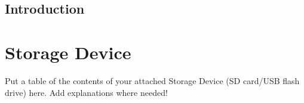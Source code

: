 \documentclass[german=false,thesistype=bachelor,nolistoftables,noabstract]{tubsthesis}
\begin{document}

\begin{thesis}

\chapter{Introduction}

\lipsum[1-3]

\end{thesis}

\chapter{Storage Device}
Put a table of the contents of your attached Storage Device (SD card/USB flash drive) here.
Add explanations where needed!
\end{document}
